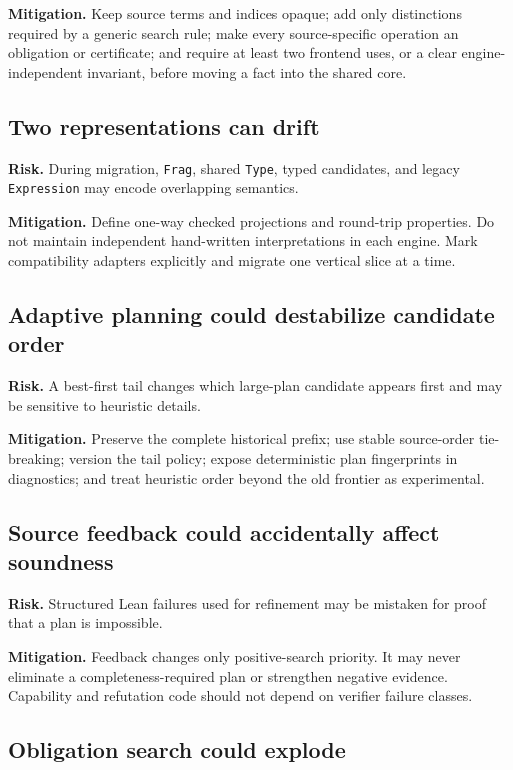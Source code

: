 \documentclass[11pt]{article}
\newcommand{\code}[1]{\texttt{#1}}
\begin{document}
\textbf{Mitigation.}  Keep source terms and indices opaque; add only distinctions
required by a generic search rule; make every source-specific operation an
obligation or certificate; and require at least two frontend uses, or a clear
engine-independent invariant, before moving a fact into the shared core.

\subsection{Two representations can drift}

\textbf{Risk.}  During migration, \code{Frag}, shared \code{Type}, typed
candidates, and legacy \code{Expression} may encode overlapping semantics.

\textbf{Mitigation.}  Define one-way checked projections and round-trip
properties.  Do not maintain independent hand-written interpretations in each
engine.  Mark compatibility adapters explicitly and migrate one vertical slice
at a time.

\subsection{Adaptive planning could destabilize candidate order}

\textbf{Risk.}  A best-first tail changes which large-plan candidate appears
first and may be sensitive to heuristic details.

\textbf{Mitigation.}  Preserve the complete historical prefix; use stable
source-order tie-breaking; version the tail policy; expose deterministic plan
fingerprints in diagnostics; and treat heuristic order beyond the old frontier
as experimental.

\subsection{Source feedback could accidentally affect soundness}

\textbf{Risk.}  Structured Lean failures used for refinement may be mistaken
for proof that a plan is impossible.

\textbf{Mitigation.}  Feedback changes only positive-search priority.  It may
never eliminate a completeness-required plan or strengthen negative evidence.
Capability and refutation code should not depend on verifier failure classes.

\subsection{Obligation search could explode}
\end{document}
